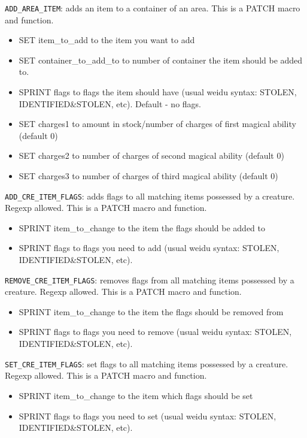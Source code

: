 \documentclass{article}
\begin{document}
\verb+ADD_AREA_ITEM+: adds an item to a container of an area.
This is a PATCH macro and function.
\begin{itemize}
\item SET item_to_add to the item you want to add 
\item SET container_to_add_to to number of container the item should be added to.
\item SPRINT flags to flags the item should have (usual weidu syntax: STOLEN, IDENTIFIED&STOLEN, etc). Default - no flags.
\item SET charges1 to amount in stock/number of charges of first magical ability (default 0)
\item SET charges2 to number of charges of second magical ability (default 0)
\item SET charges3 to number of charges of third magical ability (default 0)
\end{itemize}

\verb+ADD_CRE_ITEM_FLAGS+: adds flags to all matching items possessed by a creature. Regexp allowed.
This is a PATCH macro and function.
\begin{itemize}
\item SPRINT item_to_change to the item the flags should be added to
\item SPRINT flags to flags you need to add (usual weidu syntax: STOLEN, IDENTIFIED&STOLEN, etc).
\end{itemize}

\verb+REMOVE_CRE_ITEM_FLAGS+: removes flags from all matching items possessed by a creature. Regexp allowed.
This is a PATCH macro and function.
\begin{itemize}
\item SPRINT item_to_change to the item the flags should be removed from
\item SPRINT flags to flags you need to remove (usual weidu syntax: STOLEN, IDENTIFIED&STOLEN, etc).
\end{itemize}

\verb+SET_CRE_ITEM_FLAGS+: set flags to all matching items possessed by a creature. Regexp allowed.
This is a PATCH macro and function.
\begin{itemize}
\item SPRINT item_to_change to the item which flags should be set
\item SPRINT flags to flags you need to set (usual weidu syntax: STOLEN, IDENTIFIED&STOLEN, etc).
\end{itemize}
\end{document}
